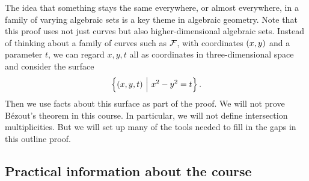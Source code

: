 \pagebreak

The idea that something stays the same everywhere, or almost everywhere, in a family of varying algebraic sets is a key theme in algebraic geometry. Note that this proof uses not just curves but also higher-dimensional algebraic sets. Instead of thinking about a family of curves such as $ \mathcal{F} $, with coordinates $ \br{x, y} $ and a parameter $ t $, we can regard $ x, y, t $ all as coordinates in three-dimensional space and consider the surface
$$ \cbr{\br{x, y, t} \st x^2 - y^2 = t}. $$
Then we use facts about this surface as part of the proof. We will not prove B\'ezout's theorem in this course. In particular, we will not define intersection multiplicities. But we will set up many of the tools needed to fill in the gaps in this outline proof.

\subsection{Practical information about the course}

